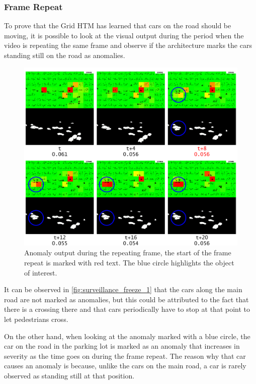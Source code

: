 \subsubsection{Frame Repeat}
To prove that the Grid HTM has learned that cars on the road should be moving, it is possible to look at the visual output during the period when the video is repeating the same frame and observe if the architecture marks the cars standing still on the road as anomalies.
\begin{figure}[H]
    \centering
    \includegraphics[width=\textwidth]{resources/experiments/surveillance/surveillance_freeze_1.png}
    \caption[Frame Repeat Anomaly]{Anomaly output during the repeating frame, the start of the frame repeat is marked with red text. The blue circle highlights the object of interest.}
    \label{fig:surveillance_freeze_1}
\end{figure}
It can be observed in \autoref{fig:surveillance_freeze_1} that the cars along the main road are not marked as anomalies, but this could be attributed to the fact that there is a crossing there and that cars periodically have to stop at that point to let pedestrians cross.
\par
On the other hand, when looking at the anomaly marked with a blue circle, the car on the road in the parking lot is marked as an anomaly that increases in severity as the time goes on during the frame repeat. The reason why that car causes an anomaly is because, unlike the cars on the main road, a car is rarely observed as standing still at that position.
